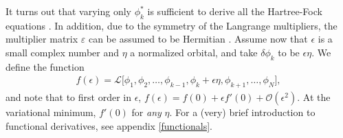 \documentclass[../../master.tex]{subfiles}
\begin{document}
It turns out that varying only $\phi_k^*$ is sufficient to derive all the Hartree-Fock equations \cite{kvaal}. In addition, due to the symmetry of the Langrange multipliers, the multiplier matrix $\varepsilon$ can be assumed to be Hermitian \cite{thijssen}. Assume now that $\epsilon$ is a small complex number and $\eta$ a normalized orbital, and take $\delta \phi_k$ to be $\epsilon\eta$. We define the function 
\begin{align}
f(\epsilon)=\mathcal{L}\Big[\phi_1,\phi_2,\dots,\phi_{k-1},\phi_k+\epsilon\eta,\phi_{k+1},\dots,\phi_N],
\end{align}
and note that to first order in $\epsilon$, $f(\epsilon)=f(0)+\epsilon f'(0)+\mathcal{O}(\epsilon^2)$. At the variational minimum, $f'(0)$ for \emph{any} $\eta$. For a (very) brief introduction to functional derivatives, see appendix \ref{functionals}.
\end{document}
